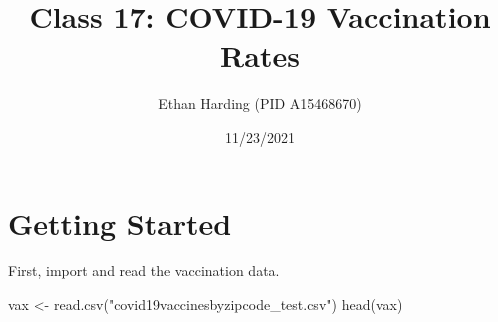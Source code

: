 \documentclass[
]{article}
\title{Class 17: COVID-19 Vaccination Rates}
\author{Ethan Harding (PID A15468670)}
\date{11/23/2021}
\newenvironment{Shaded}{\begin{snugshade}}{\end{snugshade}}
\newcommand{\FunctionTok}[1]{\textcolor[rgb]{0.00,0.00,0.00}{#1}}
\newcommand{\NormalTok}[1]{#1}
\newcommand{\OtherTok}[1]{\textcolor[rgb]{0.56,0.35,0.01}{#1}}
\newcommand{\StringTok}[1]{\textcolor[rgb]{0.31,0.60,0.02}{#1}}
\begin{document}
\maketitle

\hypertarget{getting-started}{%
\section{Getting Started}\label{getting-started}}

First, import and read the vaccination data.

\begin{Shaded}
\begin{Highlighting}[]
\NormalTok{vax }\OtherTok{\textless{}{-}} \FunctionTok{read.csv}\NormalTok{(}\StringTok{"covid19vaccinesbyzipcode\_test.csv"}\NormalTok{)}
\FunctionTok{head}\NormalTok{(vax)}
\end{Highlighting}
\end{Shaded}
\end{document}
